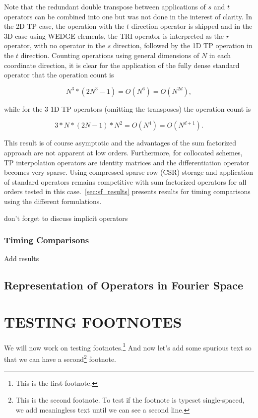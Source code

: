 \documentclass[12pt,Bold,letterpaper,TexShade]{mcgilletdclass}
\numberwithin{equation}{section}
\begin{document}
Note that the redundant double transpose between applications of $s$ and $t$ operators can be combined into one but was not done in the interest of clarity. In the 2D TP case, the operation with the $t$ direction operator is skipped and in the 3D case using WEDGE elements, the TRI operator is interpreted as the $r$ operator, with no operator in the $s$ direction, followed by the 1D TP operation in the $t$ direction. Counting operations using general dimensions of $N$ in each coordinate direction, it is clear for the application of the fully dense standard operator that the operation count is

\begin{equation}
N^3 * (2N^3-1) = O(N^6) = O(N^{2d}),
\end{equation}

while for the 3 1D TP operators (omitting the transposes) the operation count is

\begin{equation}
3*N * (2N-1)*N^2 = O(N^4) = O(N^{d+1}).
\end{equation}

This result is of course asymptotic and the advantages of the sum factorized approach are not apparent at low orders. Furthermore, for collocated schemes, TP interpolation operators are identity matrices and the differentiation operator becomes very sparse. Using compressed sparse row (CSR) storage and application of standard operators remains competitive with sum factorized operators for all orders tested in this case.~\autoref{sec:sf_results} presents results for timing comparisons using the different formulations.

{\color{red} don't forget to discuss implicit operators}

\subsection{Timing Comparisons}
\label{sec:sf_results}

{\color{red} Add results}

\section{Representation of Operators in Fourier Space}




\chapter{TESTING FOOTNOTES}
We will now work on testing footnotes.\footnote{This is the first footnote.}
And now let's add some spurious text so that we can have a second\footnote{This
is the second footnote. To test if the footnote is typeset single-spaced, 
we add meaningless text until we can see a second line.} footnote.
\end{document}

